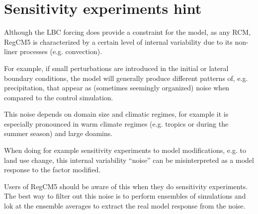 \section{Sensitivity experiments hint}

Although the LBC forcing does provide a constraint for the model, as any RCM,
RegCM5 is characterized by a certain level of internal variability due to its
non-liner processes (e.g. convection).

For example, if small perturbations are introduced in the initial or lateral
boundary conditions, the model will generally produce different patterns of,
e.g. precipitation, that appear as (sometimes seemingly organized) noise when
compared to the control simulation.

This noise depends on domain size and climatic regimes, for example it is
especially pronounced in warm climate regimes (e.g. tropics or during the
summer season) and large doamins.

When doing for example sensitivity experiments to model modifications, e.g. to
land use change, this internal variability “noise” can be misinterpreted as a
model response to the factor modified.

Users of RegCM5 should be aware of this when they do sensitivity experiments.
The best way to filter out this noise is to perform ensembles of simulations
and lok at the ensemble averages to extract the real model response from the
noise.
